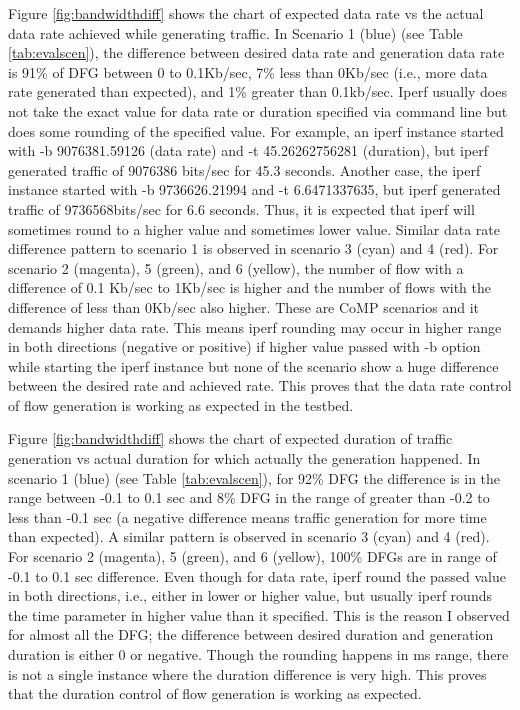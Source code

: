 Figure \ref{fig:bandwidthdiff} shows the chart of expected data rate vs the actual data rate achieved while generating traffic. In Scenario 1 (blue) (see Table \ref{tab:evalscen}), the difference between desired data rate and generation data rate is 91\% of DFG between 0 to 0.1Kb/sec, 7\% less than 0Kb/sec (i.e., more data rate generated than expected), and 1\% greater than 0.1kb/sec. Iperf usually does not take the exact value for data rate or duration specified via command line but does some rounding of the specified value. For example, an iperf instance started with -b 9076381.59126 (data rate) and -t 45.26262756281 (duration), but iperf generated traffic of 9076386 bits/sec for 45.3 seconds. Another case, the iperf instance started with -b 9736626.21994 and -t 6.6471337635, but iperf generated traffic of 9736568bits/sec for 6.6 seconds. Thus, it is expected that iperf will sometimes round to a higher value and sometimes lower value. Similar data rate difference pattern to scenario 1 is observed in scenario 3 (cyan) and 4 (red). For scenario 2 (magenta), 5 (green), and 6 (yellow), the number of flow with a difference of 0.1 Kb/sec to 1Kb/sec is higher and the number of flows with the difference of less than 0Kb/sec also higher. These are CoMP scenarios and it demands higher data rate. This means iperf rounding may occur in higher range in both directions (negative or positive) if higher value passed with -b option while starting the iperf instance but none of the scenario show a huge difference between the desired rate and achieved rate. This proves that the data rate control of flow generation is working as expected in the testbed.

Figure \ref{fig:bandwidthdiff} shows the chart of expected duration of traffic generation vs actual duration for which actually the generation happened. In scenario 1 (blue) (see Table \ref{tab:evalscen}), for 92\% DFG the difference is in the range between -0.1 to 0.1 sec and 8\% DFG in the range of greater than -0.2 to less than -0.1 sec (a negative difference means traffic generation for more time than expected). A similar pattern is observed in scenario 3 (cyan) and 4 (red). For scenario 2 (magenta), 5 (green), and 6 (yellow), 100\% DFGs are in range of -0.1 to 0.1 sec difference. Even though for data rate, iperf round the passed value in both directions, i.e., either in lower or higher value, but usually iperf rounds the time parameter in higher value than it specified. This is the reason I observed for almost all the DFG; the difference between desired duration and generation duration is either 0 or negative. Though the rounding happens in ms range, there is not a single instance where the duration difference is very high. This proves that the duration control of flow generation is working as expected.

